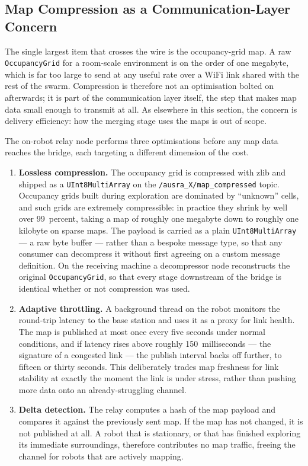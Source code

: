 \subsection{Map Compression as a Communication-Layer Concern}
\label{subsec:map_compression}

The single largest item that crosses the wire is the occupancy-grid map. A raw \texttt{OccupancyGrid} for a room-scale environment is on the order of one megabyte, which is far too large to send at any useful rate over a WiFi link shared with the rest of the swarm. Compression is therefore not an optimisation bolted on afterwards; it is part of the communication layer itself, the step that makes map data small enough to transmit at all. As elsewhere in this section, the concern is delivery efficiency: how the merging stage uses the maps is out of scope.

The on-robot relay node performs three optimisations before any map data reaches the bridge, each targeting a different dimension of the cost.

\begin{enumerate}
    \item \textbf{Lossless compression.} The occupancy grid is compressed with zlib and shipped as a \texttt{UInt8MultiArray} on the \texttt{/ausra\_X/map\_compressed} topic. Occupancy grids built during exploration are dominated by ``unknown'' cells, and such grids are extremely compressible: in practice they shrink by well over 99~percent, taking a map of roughly one megabyte down to roughly one kilobyte on sparse maps. The payload is carried as a plain \texttt{UInt8MultiArray} --- a raw byte buffer --- rather than a bespoke message type, so that any consumer can decompress it without first agreeing on a custom message definition. On the receiving machine a decompressor node reconstructs the original \texttt{OccupancyGrid}, so that every stage downstream of the bridge is identical whether or not compression was used.
    \item \textbf{Adaptive throttling.} A background thread on the robot monitors the round-trip latency to the base station and uses it as a proxy for link health. The map is published at most once every five seconds under normal conditions, and if latency rises above roughly 150~milliseconds --- the signature of a congested link --- the publish interval backs off further, to fifteen or thirty seconds. This deliberately trades map freshness for link stability at exactly the moment the link is under stress, rather than pushing more data onto an already-struggling channel.
    \item \textbf{Delta detection.} The relay computes a hash of the map payload and compares it against the previously sent map. If the map has not changed, it is not published at all. A robot that is stationary, or that has finished exploring its immediate surroundings, therefore contributes no map traffic, freeing the channel for robots that are actively mapping.
\end{enumerate}

